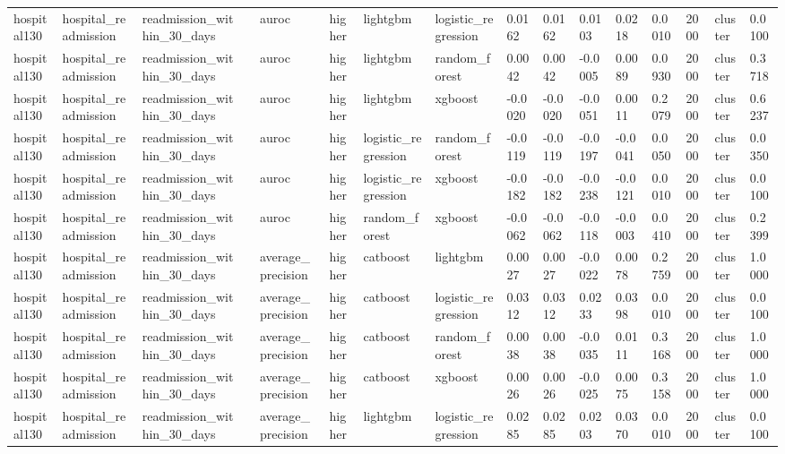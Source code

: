 \begin{tabular}{llllllllllllllll}
hospital130 & hospital\_readmission & readmission\_within\_30\_days &  & auroc & higher & lightgbm & logistic\_regression & 0.0162 & 0.0162 & 0.0103 & 0.0218 & 0.0010 & 2000 & cluster & 0.0100 \\
hospital130 & hospital\_readmission & readmission\_within\_30\_days &  & auroc & higher & lightgbm & random\_forest & 0.0042 & 0.0042 & -0.0005 & 0.0089 & 0.0930 & 2000 & cluster & 0.3718 \\
hospital130 & hospital\_readmission & readmission\_within\_30\_days &  & auroc & higher & lightgbm & xgboost & -0.0020 & -0.0020 & -0.0051 & 0.0011 & 0.2079 & 2000 & cluster & 0.6237 \\
hospital130 & hospital\_readmission & readmission\_within\_30\_days &  & auroc & higher & logistic\_regression & random\_forest & -0.0119 & -0.0119 & -0.0197 & -0.0041 & 0.0050 & 2000 & cluster & 0.0350 \\
hospital130 & hospital\_readmission & readmission\_within\_30\_days &  & auroc & higher & logistic\_regression & xgboost & -0.0182 & -0.0182 & -0.0238 & -0.0121 & 0.0010 & 2000 & cluster & 0.0100 \\
hospital130 & hospital\_readmission & readmission\_within\_30\_days &  & auroc & higher & random\_forest & xgboost & -0.0062 & -0.0062 & -0.0118 & -0.0003 & 0.0410 & 2000 & cluster & 0.2399 \\
hospital130 & hospital\_readmission & readmission\_within\_30\_days &  & average\_precision & higher & catboost & lightgbm & 0.0027 & 0.0027 & -0.0022 & 0.0078 & 0.2759 & 2000 & cluster & 1.0000 \\
hospital130 & hospital\_readmission & readmission\_within\_30\_days &  & average\_precision & higher & catboost & logistic\_regression & 0.0312 & 0.0312 & 0.0233 & 0.0398 & 0.0010 & 2000 & cluster & 0.0100 \\
hospital130 & hospital\_readmission & readmission\_within\_30\_days &  & average\_precision & higher & catboost & random\_forest & 0.0038 & 0.0038 & -0.0035 & 0.0111 & 0.3168 & 2000 & cluster & 1.0000 \\
hospital130 & hospital\_readmission & readmission\_within\_30\_days &  & average\_precision & higher & catboost & xgboost & 0.0026 & 0.0026 & -0.0025 & 0.0075 & 0.3158 & 2000 & cluster & 1.0000 \\
hospital130 & hospital\_readmission & readmission\_within\_30\_days &  & average\_precision & higher & lightgbm & logistic\_regression & 0.0285 & 0.0285 & 0.0203 & 0.0370 & 0.0010 & 2000 & cluster & 0.0100 \\

\end{tabular}
